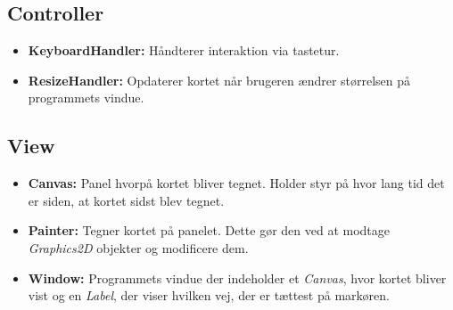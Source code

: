 \subsection{Controller}

\begin{itemize}
	\item \textbf{KeyboardHandler:} Håndterer interaktion via tastetur.
	\item \textbf{ResizeHandler:} Opdaterer kortet når brugeren ændrer størrelsen på programmets vindue.
\end{itemize}

\subsection{View}

\begin{itemize}
	\item \textbf{Canvas:} Panel hvorpå kortet bliver tegnet. Holder styr på hvor lang tid det er siden, at kortet sidst blev tegnet.
	\item \textbf{Painter:} Tegner kortet på panelet. Dette gør den ved at modtage \emph{Graphics2D} objekter og modificere dem.
	\item \textbf{Window:} Programmets vindue der indeholder et \emph{Canvas}, hvor kortet bliver vist og en \emph{Label}, der viser hvilken vej, der er tættest på markøren.
\end{itemize}